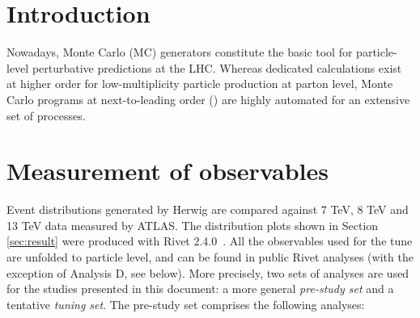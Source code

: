 \documentclass[PUB, UKenglish, texlive=2016]{\ATLASLATEXPATH atlasdoc}
\begin{document}
\maketitle

\tableofcontents


\section{Introduction}
\label{sec:intro}

Nowadays, Monte Carlo (MC) generators constitute the basic tool for particle-level perturbative predictions at the LHC. Whereas dedicated calculations exist at higher order for low-multiplicity particle production at parton level, Monte Carlo programs at next-to-leading order (\NLO) are highly automated for an extensive set of processes.

\section{Measurement of \ttbar observables}
\label{sec:analyses}

Event distributions generated by Herwig are compared against 7 TeV, 8 TeV and 13 TeV data measured by ATLAS. The distribution plots shown in Section \ref{sec:result} were produced with Rivet 2.4.0~\cite{Buckley:2010ar}. All the observables used for the tune are unfolded to particle level, and can be found in public Rivet analyses (with the exception of Analysis D, see below). More precisely, two sets of analyses are used for the studies presented in this document: a more general \textit{pre-study set} and a tentative \textit{tuning set}. The pre-study set comprises the following analyses:
\end{document}

